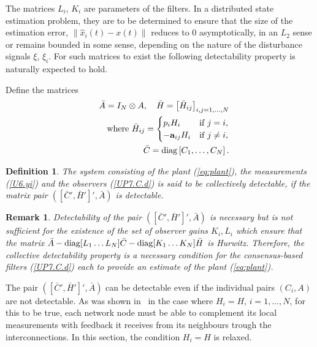 \documentclass[a4paper,10pt,conference]{ieeeconf}
\newtheorem{definition}{Definition}
\newtheorem{remark}{Remark}
\begin{document}
The matrices $L_i$, $K_i$ are parameters of the filters.
In a distributed state estimation problem,  they are
to be determined to ensure that the size of the estimation error, $\|\hat
x_i(t)-x(t)\|$ reduces to 0 asymptotically, in an $L_2$ sense 
or remains bounded in some sense, depending on
the nature of the disturbance signals 
$\xi$, $\xi_i$. For such matrices to exist the following detectability
property is naturally expected to hold.

Define the matrices
\begin{eqnarray*}
&&\bar A=I_N\otimes A, \quad \bar H=\left[\bar
  H_{ij}\right]_{i,j=1,\ldots,N}\\
&& \mbox{where }\bar H_{ij}=\begin{cases}p_i H_i & \text{if $j=i$},\\ 
-\mathbf{a}_{ij} H_i & \text{if $j\neq i$},
\end{cases}\\
&& \bar C=\mathop{\mathrm{diag}}\nolimits\left[C_1,\ldots,C_N\right]. 
\label{Cs}
\end{eqnarray*}

\begin{definition}
The system consisting of the plant (\ref{eq:plant}), the measurements
(\ref{U6.yi}) and the observers (\ref{UP7.C.d}) is said to be \emph{collectively
detectable}, if the matrix pair  
$([\bar C',\bar H']',\bar A)$ is detectable.
\end{definition} 

\begin{remark}
Detectability of the pair $([\bar C',\bar H']',\bar A)$ is necessary but
is not sufficient for the existence of the set of observer gains $K_i,L_i$
which ensure that the matrix 
$\bar A-\mathop{\mathrm{diag}}\nolimits[L_1\ldots L_N]\bar C-\mathop{\mathrm{diag}}\nolimits[K_1\ldots K_N]\bar H$ is
Hurwitz. Therefore, 
the collective detectability property is a necessary condition for the
consensus-based filters (\ref{UP7.C.d}) each to provide an
estimate of the plant (\ref{eq:plant}).
\end{remark}


The pair $([\bar C',\bar H']',\bar A)$ can be detectable even if
the individual pairs $(C_i,A)$ are not detectable. As was shown
in~\cite{U7b-journal} in the case where $H_i=H$,  
$i=1,\ldots,N$, for this to be true, each network node must be able
to complement its local measurements with feedback it receives from its 
neighbours trough the interconnections. In this section, the condition
$H_i=H$ is relaxed.  
\end{document}
